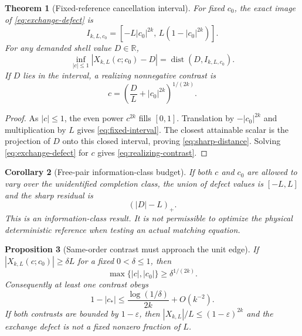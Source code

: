 \documentclass[11pt]{article}
\newtheorem{theorem}{Theorem}[section]
\newtheorem{corollary}[theorem]{Corollary}
\newtheorem{proposition}[theorem]{Proposition}
\theoremstyle{remark}
\newcommand{\dist}{\operatorname{dist}}
\begin{document}
\begin{theorem}[Fixed-reference cancellation interval]
\label{thm:fixed-budget}
For fixed $c_0$, the exact image of \eqref{eq:exchange-defect} is
\begin{equation}
 \boxed{
 I_{k,L,c_0}
 =[-L|c_0|^{2k},\,L(1-|c_0|^{2k})].}
 \label{eq:fixed-interval}
\end{equation}
For any demanded shell value $D\in\mathbb R$,
\begin{equation}
 \inf_{|c|\le1}|X_{k,L}(c;c_0)-D|
 =\dist(D,I_{k,L,c_0}).
 \label{eq:sharp-distance}
\end{equation}
If $D$ lies in the interval, a realizing nonnegative contrast is
\begin{equation}
 c=\left(\frac DL+|c_0|^{2k}\right)^{1/(2k)}.
 \label{eq:realizing-contrast}
\end{equation}
\end{theorem}

\begin{proof}
As $|c|\le1$, the even power $c^{2k}$ fills $[0,1]$.  Translation by
$-|c_0|^{2k}$ and multiplication by $L$ gives
\eqref{eq:fixed-interval}.  The closest attainable scalar is the projection
of $D$ onto this closed interval, proving \eqref{eq:sharp-distance}.
Solving \eqref{eq:exchange-defect} for $c$ gives
\eqref{eq:realizing-contrast}.
\end{proof}

\begin{corollary}[Free-pair information-class budget]
\label{cor:free-budget}
If both $c$ and $c_0$ are allowed to vary over the unidentified completion
class, the union of defect values is $[-L,L]$ and the sharp residual is
\begin{equation}
 (|D|-L)_+.
 \label{eq:free-distance}
\end{equation}
This is an information-class result.  It is not permissible to optimize the
physical deterministic reference when testing an actual matching equation.
\end{corollary}

\begin{proposition}[Same-order contrast must approach the unit edge]
\label{prop:edge-law}
If $|X_{k,L}(c;c_0)|\ge\delta L$ for a fixed $0<\delta\le1$, then
\begin{equation}
 \max\{|c|,|c_0|\}\ge\delta^{1/(2k)}.
 \label{eq:edge-necessity}
\end{equation}
Consequently at least one contrast obeys
\begin{equation}
 1-|c_*|\le\frac{\log(1/\delta)}{2k}+O(k^{-2}).
 \label{eq:edge-gap}
\end{equation}
If both contrasts are bounded by $1-\varepsilon$, then
$|X_{k,L}|/L\le(1-\varepsilon)^{2k}$ and the exchange defect is not a
fixed nonzero fraction of $L$.
\end{proposition}
\end{document}
